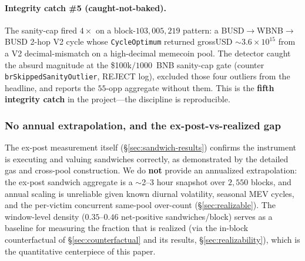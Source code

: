 \documentclass[11pt]{article}
\newcommand{\code}[1]{\texttt{#1}}
\begin{document}
\paragraph{Integrity catch \#5 (caught-not-baked).} The sanity-cap fired $4\times$ on a
block-$103{,}005{,}219$ pattern: a BUSD$\to$WBNB$\to$BUSD 2-hop V2 cycle whose
\code{CycleOptimum} returned grossUSD $\sim$$3.6\times10^{15}$ from a V2
decimal-mismatch on a high-decimal memecoin pool. The detector caught the absurd
magnitude at the \$100k$/$$1000$~BNB sanity-cap gate (counter
\code{brSkippedSanityOutlier}, REJECT log), excluded those four outliers from the
headline, and reports the $55$-opp aggregate without them. This is the
\textbf{fifth integrity catch} in the project---the discipline is reproducible.

\subsubsection{No annual extrapolation, and the ex-post-vs-realized gap}
\label{sec:extval}
The ex-post measurement itself (\S\ref{sec:sandwich-results}) confirms the instrument is
executing and valuing sandwiches correctly, as demonstrated by the detailed gas and
cross-pool construction. We do \textbf{not} provide an annualized extrapolation: the
ex-post sandwich aggregate is a $\sim$2--3 hour snapshot over $2{,}550$ blocks, and annual
scaling is unreliable given known diurnal volatility, seasonal MEV cycles, and the
per-victim concurrent same-pool over-count (\S\ref{sec:realizable}). The window-level
density ($0.35$--$0.46$ net-positive sandwiches/block) serves as a baseline for measuring
the fraction that is realized (via the in-block counterfactual of
\S\ref{sec:counterfactual} and its results, \S\ref{sec:realizability}), which is the
quantitative centerpiece of this paper.
\end{document}
